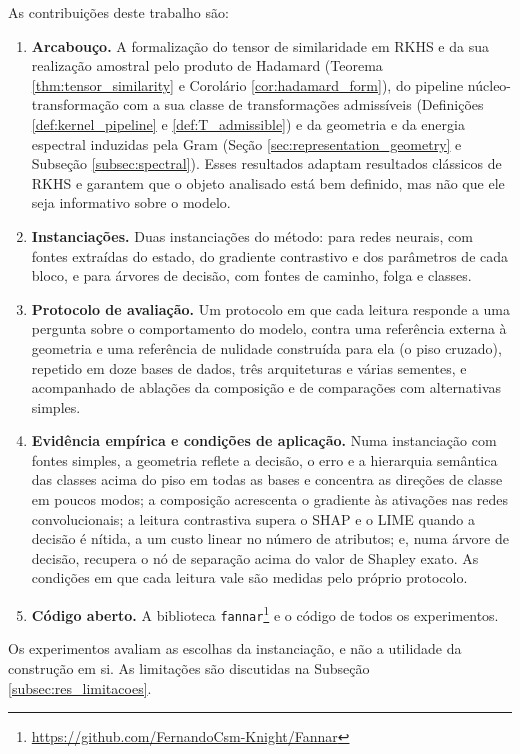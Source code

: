 As contribuições deste trabalho são:

\begin{enumerate}
    \item \textbf{Arcabouço.} A formalização do tensor de similaridade em RKHS e da sua realização amostral pelo produto de Hadamard (Teorema \ref{thm:tensor_similarity} e Corolário \ref{cor:hadamard_form}), do pipeline núcleo-transformação com a sua classe de transformações admissíveis (Definições \ref{def:kernel_pipeline} e \ref{def:T_admissible}) e da geometria e da energia espectral induzidas pela Gram (Seção \ref{sec:representation_geometry} e Subseção \ref{subsec:spectral}). Esses resultados adaptam resultados clássicos de RKHS \citep{Aronszajn1950, Schur1911} e garantem que o objeto analisado está bem definido, mas não que ele seja informativo sobre o modelo.
    \item \textbf{Instanciações.} Duas instanciações do método: para redes neurais, com fontes extraídas do estado, do gradiente contrastivo e dos parâmetros de cada bloco, e para árvores de decisão, com fontes de caminho, folga e classes.
    \item \textbf{Protocolo de avaliação.} Um protocolo em que cada leitura responde a uma pergunta sobre o comportamento do modelo, contra uma referência externa à geometria e uma referência de nulidade construída para ela (o piso cruzado), repetido em doze bases de dados, três arquiteturas e várias sementes, e acompanhado de ablações da composição e de comparações com alternativas simples.
    \item \textbf{Evidência empírica e condições de aplicação.} Numa instanciação com fontes simples, a geometria reflete a decisão, o erro e a hierarquia semântica das classes acima do piso em todas as bases e concentra as direções de classe em poucos modos; a composição acrescenta o gradiente às ativações nas redes convolucionais; a leitura contrastiva supera o SHAP e o LIME quando a decisão é nítida, a um custo linear no número de atributos; e, numa árvore de decisão, recupera o nó de separação acima do valor de Shapley exato. As condições em que cada leitura vale são medidas pelo próprio protocolo.
    \item \textbf{Código aberto.} A biblioteca \texttt{fannar}\footnote{\url{https://github.com/FernandoCsm-Knight/Fannar}} e o código de todos os experimentos.
\end{enumerate}

Os experimentos avaliam as escolhas da instanciação, e não a utilidade da construção em si. As limitações são discutidas na Subseção \ref{subsec:res_limitacoes}.
